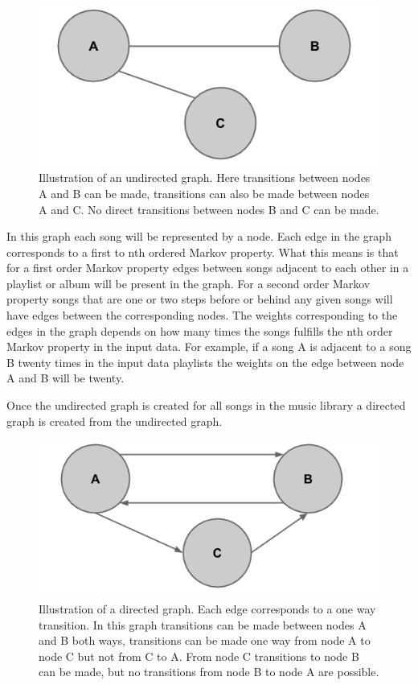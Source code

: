 \documentclass[a4paper,11pt]{kth-mag}
\begin{document}
\begin{figure}
\centering
\includegraphics[scale=0.4]{images/UGM.png}
\caption{Illustration of an undirected graph. Here transitions between nodes A and B can be made, transitions can also be made between nodes A and C. No direct transitions between nodes B and C can be made.}
\end{figure}

In this graph each song will be represented by a node. Each edge in the graph corresponds to a first to nth ordered Markov property. What this means is that for a first order Markov property edges between songs adjacent to each other in a playlist or album will be present in the graph. For a second order Markov property songs that are one or two steps before or behind any given songs will have edges between the corresponding nodes. The weights corresponding to the edges in the graph depends on how many times the songs fulfills the nth order Markov property in the input data. For example, if a song A is adjacent to a song B twenty times in the input data playlists the weights on the edge between node A and B will be twenty.

  Once the undirected graph is created for all songs in the music library a directed graph is created from the undirected graph.
  
\begin{figure}
\centering
\includegraphics[scale=0.4]{images/DGM.png}
\caption{Illustration of a directed graph. Each edge corresponds to a one way transition. In this graph transitions can be made between nodes A and B both ways, transitions can be made one way from node A to node C but not from C to A. From node C transitions to node B can be made, but no transitions from node B to node A are possible.}
\end{figure}  
  
\end{document}
